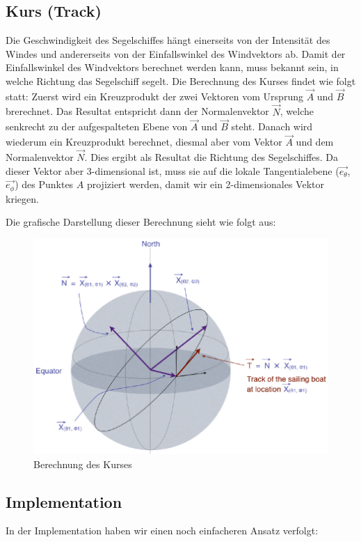 \subsection{Kurs (Track)}
Die Geschwindigkeit des Segelschiffes hängt einerseits von der Intensität des
Windes und andererseits von der Einfallswinkel des Windvektors ab. Damit der
Einfallswinkel des Windvektors berechnet werden kann, muss bekannt sein, in
welche Richtung das Segelschiff segelt. Die Berechnung des Kurses findet wie
folgt statt: Zuerst wird ein Kreuzprodukt der zwei Vektoren vom Ursprung
\(\overrightarrow{A}\) und \(\overrightarrow{B}\) brerechnet. Das Resultat
entspricht dann der Normalenvektor \(\overrightarrow{N}\), welche senkrecht zu
der aufgespalteten Ebene von \(\overrightarrow{A}\) und \(\overrightarrow{B}\)
steht. Danach wird wiederum ein Kreuzprodukt berechnet, diesmal aber vom Vektor
\(\overrightarrow{A}\) und dem Normalenvektor \(\overrightarrow{N}\). Dies
ergibt als Resultat die Richtung des Segelschiffes. Da dieser Vektor aber
3-dimensional ist, muss sie auf die lokale Tangentialebene
(\(\overrightarrow{e_{\theta}}\), \(\overrightarrow{e_{\phi}}\)) des Punktes
$A$ projiziert werden, damit wir ein 2-dimensionales Vektor kriegen.

Die grafische Darstellung dieser Berechnung sieht wie folgt aus:

\begin{figure}[h!]
\centering
\includegraphics[width=0.8\linewidth]{img/track}
\caption{Berechnung des Kurses}
\label{gridnetConn}
\end{figure}

\subsection{Implementation}
In der Implementation haben wir einen noch einfacheren Ansatz verfolgt:

